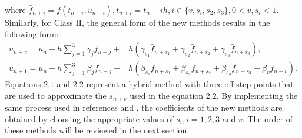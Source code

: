 \documentclass[11pt,twoside, final]{amsart}
\begin{document}
where
 $ \bar{f}_{n+i}=f(t_{n+i}, \bar{u}_{n+i}), t_{n+i}=t_{n}+i h, i\in \{v, s_{i}, s_{2}, s_{3}\}, 0<v, s_{i}<1.$
 Similarly, for Class II, the general form of the new methods results in the following form: 
  \begin{align}
 \bar{u}_{n+v}=u_{n}+h\sum_{j=1}^{3}\gamma_{j}f_{n-j}+ &  h(\gamma_{s_{1}}\bar{f}_{n+s_{1}}+\gamma_{s_{2}}\bar{f}_{n+s_{2}}+\gamma_{s_{3}}\bar{f}_{n+s_{3}}), \label{2.2}\\
u_{n+1}=u_{n}+h\sum_{j=1}^{3}\beta_{j}f_{n-j}+ &  h(\beta_{s_{1}}\bar{f}_{n+s_{1}}+\beta_{s_{2}}\bar{f}_{n+s_{2}}+\beta_{s_{3}}\bar{f}_{n+s_{3}}+\beta_{v}\bar{f}_{n+v}). \label{2.3}
\end{align}
  Equations $2.1$ and $2.2$ represent a hybrid method with three off-step points that are used to approximate the $\bar{s}_{n+v}$  used in the  equation $2.2$.
By implementing the same process used in references \cite{ALI6}  and \cite{ALI1,ALI5}, the coefficients of the new methods are obtained by choosing the appropriate values ​​of $s_{i}, i=1,2,3$ and $v$. The order of these methods will be reviewed in the next section.


\end{document}
